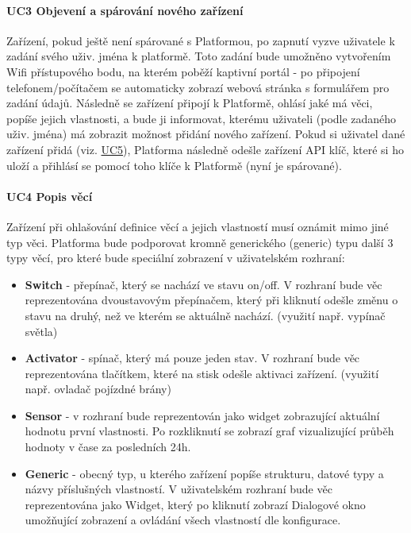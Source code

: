 \paragraph{UC3 Objevení a spárování nového zařízení}
Zařízení, pokud ještě není spárované s Platformou, po zapnutí vyzve uživatele k zadání svého uživ. jména k platformě. Toto zadání bude umožněno vytvořením Wifi přístupového bodu, na kterém poběží kaptivní portál - po připojení telefonem/počítačem se automaticky zobrazí webová stránka s formulářem pro zadání údajů. Následně se zařízení připojí k Platformě, ohlásí jaké má věci, popíše jejich vlastnosti, a bude ji informovat, kterému uživateli (podle zadaného uživ. jména) má zobrazit možnost přidání nového zařízení. Pokud si uživatel dané zařízení přidá (viz. \hyperref[UC5]{UC5}), Platforma následně odešle zařízení API klíč, které si ho uloží a přihlásí se pomocí toho klíče k Platformě (nyní je spárované).

\paragraph{UC4 Popis věcí}
Zařízení při ohlašování definice věcí a jejich vlastností musí oznámit mimo jiné typ věci. Platforma bude podporovat kromně generického (generic) typu další 3 typy věcí, pro které bude speciální zobrazení v uživatelském rozhraní:
\begin{itemize}
    \item \textbf{Switch} - přepínač, který se nachází ve stavu on/off. V rozhraní bude věc reprezentována dvoustavovým přepínačem, který při kliknutí odešle změnu o stavu na druhý, než ve kterém se aktuálně nachází. (využití např. vypínač světla)
    \item \textbf{Activator} - spínač, který má pouze jeden stav. V rozhraní bude věc reprezentována tlačítkem, které na stisk odešle aktivaci zařízení. (využití např. ovladač pojízdné brány)
    \item \textbf{Sensor} - v rozhraní bude reprezentován jako widget zobrazující aktuální hodnotu první vlastnosti. Po rozkliknutí se zobrazí graf vizualizující průběh hodnoty v čase za posledních 24h.
    \item \textbf{Generic} - obecný typ, u kterého zařízení popíše strukturu, datové typy a názvy příslušných vlastností. V uživatelském rozhraní bude věc reprezentována jako Widget, který po kliknutí zobrazí Dialogové okno umožňující zobrazení a ovládání všech vlastností dle konfigurace.
\end{itemize}


